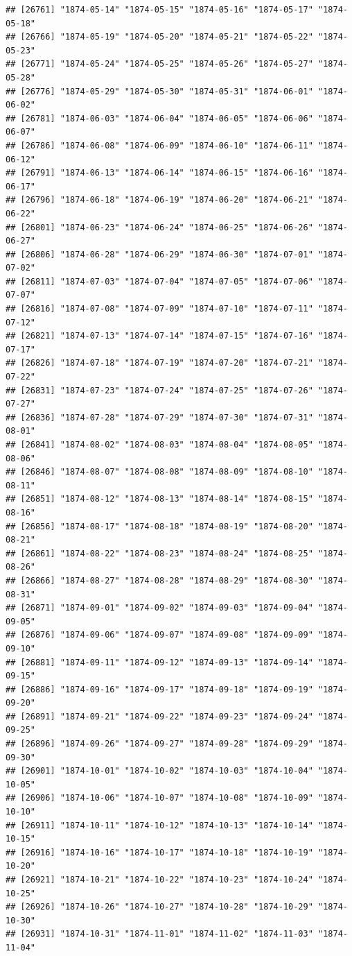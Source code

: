 \documentclass{article}\usepackage[]{graphicx}\usepackage[]{color}
\makeatletter
\newenvironment{kframe}{%
 \def\at@end@of@kframe{}%
 \ifinner\ifhmode%
  \def\at@end@of@kframe{\end{minipage}}%
  \begin{minipage}{\columnwidth}%
 \fi\fi%
 \def\FrameCommand##1{\hskip\@totalleftmargin \hskip-\fboxsep
 \colorbox{shadecolor}{##1}\hskip-\fboxsep
     \hskip-\linewidth \hskip-\@totalleftmargin \hskip\columnwidth}%
 \MakeFramed {\advance\hsize-\width
   \@totalleftmargin\z@ \linewidth\hsize
   \@setminipage}}%
 {\par\unskip\endMakeFramed%
 \at@end@of@kframe}
\newenvironment{knitrout}{}{} %
\makeatother
\begin{document}
\begin{description}
\begin{knitrout}
\begin{kframe}
\begin{verbatim}
## [26761] "1874-05-14" "1874-05-15" "1874-05-16" "1874-05-17" "1874-05-18"
## [26766] "1874-05-19" "1874-05-20" "1874-05-21" "1874-05-22" "1874-05-23"
## [26771] "1874-05-24" "1874-05-25" "1874-05-26" "1874-05-27" "1874-05-28"
## [26776] "1874-05-29" "1874-05-30" "1874-05-31" "1874-06-01" "1874-06-02"
## [26781] "1874-06-03" "1874-06-04" "1874-06-05" "1874-06-06" "1874-06-07"
## [26786] "1874-06-08" "1874-06-09" "1874-06-10" "1874-06-11" "1874-06-12"
## [26791] "1874-06-13" "1874-06-14" "1874-06-15" "1874-06-16" "1874-06-17"
## [26796] "1874-06-18" "1874-06-19" "1874-06-20" "1874-06-21" "1874-06-22"
## [26801] "1874-06-23" "1874-06-24" "1874-06-25" "1874-06-26" "1874-06-27"
## [26806] "1874-06-28" "1874-06-29" "1874-06-30" "1874-07-01" "1874-07-02"
## [26811] "1874-07-03" "1874-07-04" "1874-07-05" "1874-07-06" "1874-07-07"
## [26816] "1874-07-08" "1874-07-09" "1874-07-10" "1874-07-11" "1874-07-12"
## [26821] "1874-07-13" "1874-07-14" "1874-07-15" "1874-07-16" "1874-07-17"
## [26826] "1874-07-18" "1874-07-19" "1874-07-20" "1874-07-21" "1874-07-22"
## [26831] "1874-07-23" "1874-07-24" "1874-07-25" "1874-07-26" "1874-07-27"
## [26836] "1874-07-28" "1874-07-29" "1874-07-30" "1874-07-31" "1874-08-01"
## [26841] "1874-08-02" "1874-08-03" "1874-08-04" "1874-08-05" "1874-08-06"
## [26846] "1874-08-07" "1874-08-08" "1874-08-09" "1874-08-10" "1874-08-11"
## [26851] "1874-08-12" "1874-08-13" "1874-08-14" "1874-08-15" "1874-08-16"
## [26856] "1874-08-17" "1874-08-18" "1874-08-19" "1874-08-20" "1874-08-21"
## [26861] "1874-08-22" "1874-08-23" "1874-08-24" "1874-08-25" "1874-08-26"
## [26866] "1874-08-27" "1874-08-28" "1874-08-29" "1874-08-30" "1874-08-31"
## [26871] "1874-09-01" "1874-09-02" "1874-09-03" "1874-09-04" "1874-09-05"
## [26876] "1874-09-06" "1874-09-07" "1874-09-08" "1874-09-09" "1874-09-10"
## [26881] "1874-09-11" "1874-09-12" "1874-09-13" "1874-09-14" "1874-09-15"
## [26886] "1874-09-16" "1874-09-17" "1874-09-18" "1874-09-19" "1874-09-20"
## [26891] "1874-09-21" "1874-09-22" "1874-09-23" "1874-09-24" "1874-09-25"
## [26896] "1874-09-26" "1874-09-27" "1874-09-28" "1874-09-29" "1874-09-30"
## [26901] "1874-10-01" "1874-10-02" "1874-10-03" "1874-10-04" "1874-10-05"
## [26906] "1874-10-06" "1874-10-07" "1874-10-08" "1874-10-09" "1874-10-10"
## [26911] "1874-10-11" "1874-10-12" "1874-10-13" "1874-10-14" "1874-10-15"
## [26916] "1874-10-16" "1874-10-17" "1874-10-18" "1874-10-19" "1874-10-20"
## [26921] "1874-10-21" "1874-10-22" "1874-10-23" "1874-10-24" "1874-10-25"
## [26926] "1874-10-26" "1874-10-27" "1874-10-28" "1874-10-29" "1874-10-30"
## [26931] "1874-10-31" "1874-11-01" "1874-11-02" "1874-11-03" "1874-11-04"

\end{verbatim}
\end{kframe}
\end{knitrout}
\end{description}
\end{document}
